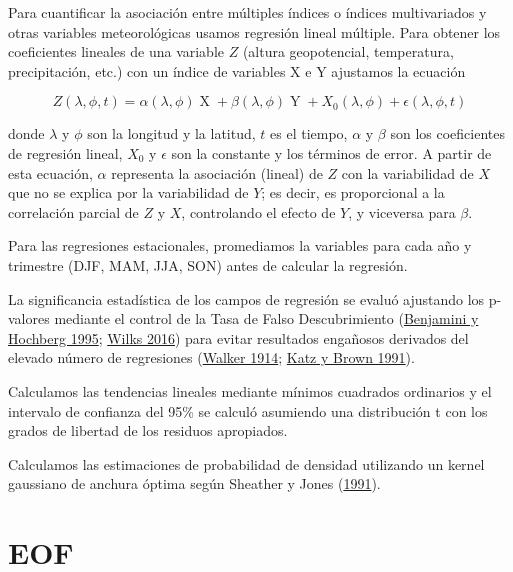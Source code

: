 \documentclass[12pt,oneside,a4paper]{reedthesis}
\begin{document}
Para cuantificar la asociación entre múltiples índices o índices multivariados y otras variables meteorológicas usamos regresión lineal múltiple.
Para obtener los coeficientes lineales de una variable \(Z\) (altura geopotencial, temperatura, precipitación, etc.) con un índice de variables X e Y ajustamos la ecuación

\begin{equation}
Z(\lambda, \phi, t) = \alpha(\lambda, \phi) \operatorname{X} + \beta(\lambda, \phi) \operatorname{Y} + X_0(\lambda, \phi) + \epsilon(\lambda, \phi, t)
\label{eq:multiple-regression-sam}
\end{equation}

donde \(\lambda\) y \(\phi\) son la longitud y la latitud, \(t\) es el tiempo, \(\alpha\) y \(\beta\) son los coeficientes de regresión lineal, \(X_0\) y \(\epsilon\) son la constante y los términos de error.
A partir de esta ecuación, \(\alpha\) representa la asociación (lineal) de \(Z\) con la variabilidad de \(X\) que no se explica por la variabilidad de \(Y\); es decir, es proporcional a la correlación parcial de \(Z\) y \(X\), controlando el efecto de \(Y\), y viceversa para \(\beta\).

Para las regresiones estacionales, promediamos la variables para cada año y trimestre (DJF, MAM, JJA, SON) antes de calcular la regresión.

La significancia estadística de los campos de regresión se evaluó ajustando los p-valores mediante el control de la Tasa de Falso Descubrimiento (\protect\hyperlink{ref-benjamini1995}{Benjamini y Hochberg 1995}; \protect\hyperlink{ref-wilks2016}{Wilks 2016}) para evitar resultados engañosos derivados del elevado número de regresiones (\protect\hyperlink{ref-walker1914}{Walker 1914}; \protect\hyperlink{ref-katz1991}{Katz y Brown 1991}).

Calculamos las tendencias lineales mediante mínimos cuadrados ordinarios y el intervalo de confianza del 95\% se calculó asumiendo una distribución t con los grados de libertad de los residuos apropiados.

Calculamos las estimaciones de probabilidad de densidad utilizando un kernel gaussiano de anchura óptima según Sheather y Jones (\protect\hyperlink{ref-sheather1991}{1991}).

\hypertarget{eof}{%
\section{EOF}\label{eof}}
\end{document}
